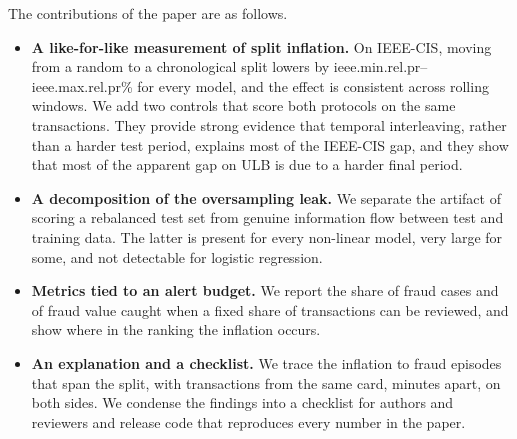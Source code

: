 The contributions of the paper are as follows.
\begin{itemize}[leftmargin=1.5em,itemsep=2pt]
\item \textbf{A like-for-like measurement of split inflation.} On IEEE-CIS, moving from a random to a chronological split lowers \prauc{} by \num{ieee.min.rel.pr}--\num{ieee.max.rel.pr}\% for every model, and the effect is consistent across rolling windows. We add two controls that score both protocols on the same transactions. They provide strong evidence that temporal interleaving, rather than a harder test period, explains most of the IEEE-CIS gap, and they show that most of the apparent gap on ULB is due to a harder final period.
\item \textbf{A decomposition of the oversampling leak.} We separate the artifact of scoring a rebalanced test set from genuine information flow between test and training data. The latter is present for every non-linear model, very large for some, and not detectable for logistic regression.
\item \textbf{Metrics tied to an alert budget.} We report the share of fraud cases and of fraud value caught when a fixed share of transactions can be reviewed, and show where in the ranking the inflation occurs.
\item \textbf{An explanation and a checklist.} We trace the inflation to fraud episodes that span the split, with transactions from the same card, minutes apart, on both sides. We condense the findings into a checklist for authors and reviewers and release code that reproduces every number in the paper.
\end{itemize}
